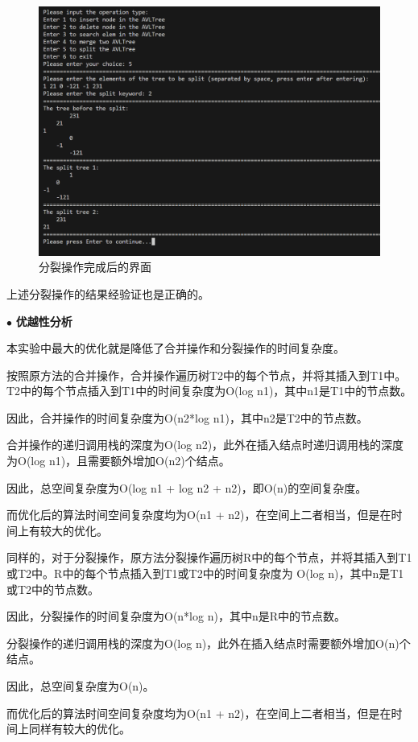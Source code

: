 \begin{figure}[H]
  \centering
  \includegraphics[width=15cm]{fig/AVLTree31.png}
  \caption{分裂操作完成后的界面}
\end{figure}

上述分裂操作的结果经验证也是正确的。

\vspace{1ex}

\noindent
$\bullet$
\textbf{优越性分析}

本实验中最大的优化就是降低了合并操作和分裂操作的时间复杂度。

按照原方法的合并操作，合并操作遍历树T2中的每个节点，并将其插入到T1中。T2中的每个节点插入到T1中的时间复杂度为O(log n1)，其中n1是T1中的节点数。

因此，合并操作的时间复杂度为O(n2*log n1)，其中n2是T2中的节点数。

合并操作的递归调用栈的深度为O(log n2)，此外在插入结点时递归调用栈的深度为O(log n1)，且需要额外增加O(n2)个结点。

因此，总空间复杂度为O(log n1 + log n2 + n2)，即O(n)的空间复杂度。

而优化后的算法时间空间复杂度均为O(n1 + n2)，在空间上二者相当，但是在时间上有较大的优化。

同样的，对于分裂操作，原方法分裂操作遍历树R中的每个节点，并将其插入到T1或T2中。R中的每个节点插入到T1或T2中的时间复杂度为 O(log n)，其中n是T1或T2中的节点数。

因此，分裂操作的时间复杂度为O(n*log n)，其中n是R中的节点数。

分裂操作的递归调用栈的深度为O(log n)，此外在插入结点时需要额外增加O(n)个结点。

因此，总空间复杂度为O(n)。

而优化后的算法时间空间复杂度均为O(n1 + n2)，在空间上二者相当，但是在时间上同样有较大的优化。
